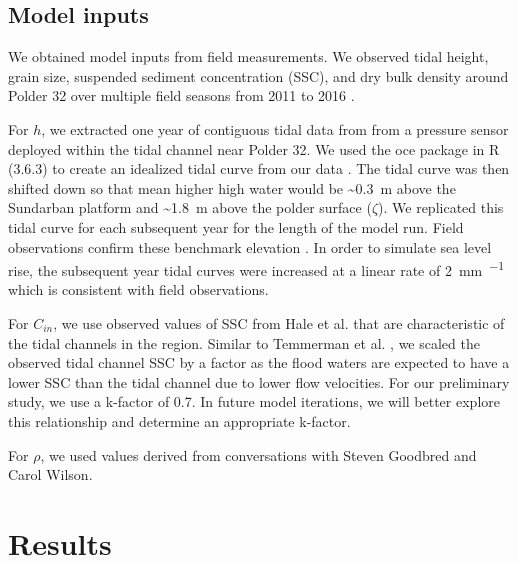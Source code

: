 \documentclass[a4paper,fleqn]{cas-dc}
\begin{document}

\subsection*{Model inputs}

We obtained model inputs from field measurements. We observed tidal height, grain size, suspended sediment concentration (SSC), and dry bulk density around Polder 32 over multiple field seasons from 2011 to 2016 \citet{auerbachFloodRiskNatural2015,haleObservationsScalingTidal2019,haleSeasonalVariabilityForces2019}.

For $h$, we extracted one year of contiguous tidal data from from a pressure sensor deployed within the tidal channel near Polder 32. We used the oce package in R (3.6.3) to create an idealized tidal curve from our data \citet{kelleyOceAnalysisOceanographic2020}. The tidal curve was then shifted down so that mean higher high water would be \SI{~0.3}{\meter} above the Sundarban platform and \SI{~1.8}{\meter} above the polder surface ($\zeta$). We replicated this tidal curve for each subsequent year for the length of the model run. Field observations confirm these benchmark elevation \citet{auerbachFloodRiskNatural2015,haleSeasonalVariabilityForces2019,bomerSurfaceElevationSedimentation2020}. In order to simulate sea level rise, the subsequent year tidal curves were increased at a linear rate of \SI{2}{\milli\meter\per\year} which is consistent with field observations.


For $C_{in}$, we use observed values of SSC from Hale et al. \citet{haleObservationsScalingTidal2019} that are characteristic of the tidal channels in the region. Similar to Temmerman et al. \citet{temmermanModellingLongtermTidal2003,temmermanModellingEstuarineVariations2004}, we scaled the observed tidal channel SSC by a factor as the flood waters are expected to have a lower SSC than the tidal channel due to lower flow velocities. For our preliminary study, we use a k-factor of 0.7. In future model iterations, we will better explore this relationship and determine an appropriate k-factor.

For $\rho$, we used values derived from conversations with Steven Goodbred and Carol Wilson.

\section{Results}
\end{document}
